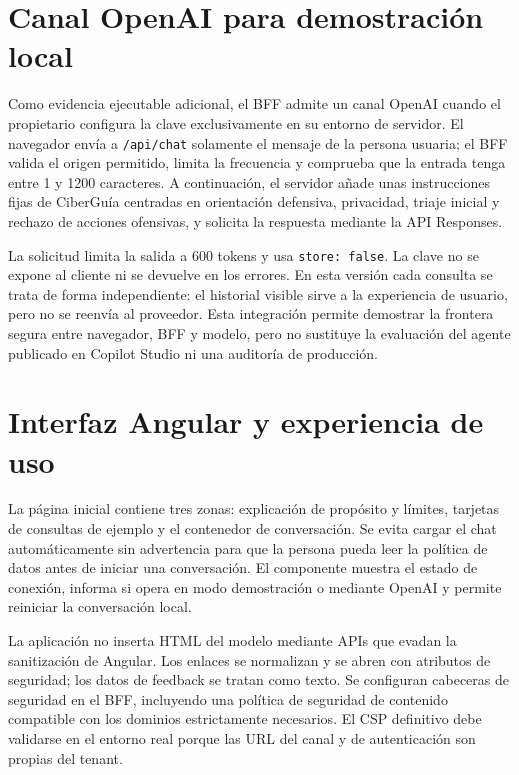 \section{Canal OpenAI para demostraci\'on local}

Como evidencia ejecutable adicional, el BFF admite un canal OpenAI cuando el propietario configura la clave exclusivamente en su entorno de servidor. El navegador env\'ia a \texttt{/api/chat} solamente el mensaje de la persona usuaria; el BFF valida el origen permitido, limita la frecuencia y comprueba que la entrada tenga entre 1 y 1200 caracteres. A continuaci\'on, el servidor a\~nade unas instrucciones fijas de CiberGu\'ia centradas en orientaci\'on defensiva, privacidad, triaje inicial y rechazo de acciones ofensivas, y solicita la respuesta mediante la API Responses.

La solicitud limita la salida a 600 tokens y usa \texttt{store: false}. La clave no se expone al cliente ni se devuelve en los errores. En esta versi\'on cada consulta se trata de forma independiente: el historial visible sirve a la experiencia de usuario, pero no se reenv\'ia al proveedor. Esta integraci\'on permite demostrar la frontera segura entre navegador, BFF y modelo, pero no sustituye la evaluaci\'on del agente publicado en Copilot Studio ni una auditor\'ia de producci\'on.

\section{Interfaz Angular y experiencia de uso}

La p\'agina inicial contiene tres zonas: explicaci\'on de prop\'osito y l\'imites, tarjetas de consultas de ejemplo y el contenedor de conversaci\'on. Se evita cargar el chat autom\'aticamente sin advertencia para que la persona pueda leer la pol\'itica de datos antes de iniciar una conversaci\'on. El componente muestra el estado de conexi\'on, informa si opera en modo demostraci\'on o mediante OpenAI y permite reiniciar la conversaci\'on local.

La aplicaci\'on no inserta HTML del modelo mediante APIs que evadan la sanitizaci\'on de Angular. Los enlaces se normalizan y se abren con atributos de seguridad; los datos de feedback se tratan como texto. Se configuran cabeceras de seguridad en el BFF, incluyendo una pol\'itica de seguridad de contenido compatible con los dominios estrictamente necesarios. El CSP definitivo debe validarse en el entorno real porque las URL del canal y de autenticaci\'on son propias del tenant.

